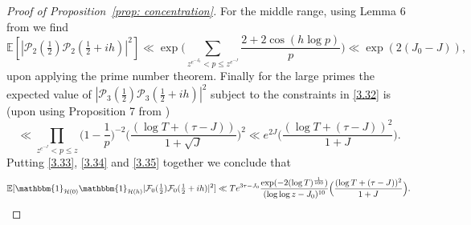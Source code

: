 \documentclass[12pt, notitlepage]{amsart}
\numberwithin{equation}{section}
\def\E{\mathbb E}
\theoremstyle{remark}
\theoremstyle{definition}
\theoremstyle{remark}
\numberwithin{equation}{section}
\begin{document}
\begin{proof}[Proof of Proposition~\ref{prop: concentration}]
For the middle range, using Lemma 6 from \cite{HarperLow} we find 
\begin{equation} 
\label{3.34} 
\E[|{\mathcal P}_2(\tfrac 12) {\mathcal P}_2(\tfrac 12+ih)|^2] \ll 
\exp\Big( \sum_{z^{e^{-J_0}} < p \le z^{e^{-J}}} \frac{2+2\cos(h\log p)}{p} \Big) \ll \exp( 2 (J_0-J)), 
\end{equation} 
upon applying the prime number theorem.  Finally for the large primes the expected value of $|{\mathcal P}_3(\tfrac 12){\mathcal P}_3(\tfrac 12 +ih)|^2$ subject to the constraints in \eqref{3.32} is (upon using Proposition 7 from \cite{HarperLow}) 
\begin{equation} 
\label{3.35} 
\ll \prod_{z^{e^{-J}}<p\le z} \Big(1-\frac 1p\Big)^{-2} \Big(\frac{(\log T + (\tau - J))}{1+\sqrt{J}}\Big)^2 
\ll e^{2J} \Big( \frac{(\log T + (\tau-J))^2}{1+J} \Big). 
\end{equation} 
Putting \eqref{3.33}, \eqref{3.34} and \eqref{3.35} together we conclude that 
\begin{equation} 
\label{3.36} 
\E[\mathbbm{1}_{\mathcal{H}(0)}\mathbbm{1}_{\mathcal{H}(h)}|{\mathcal F}_0(\tfrac 12){\mathcal F}_0(\tfrac 12+ih)|^2] 
\ll T e^{3\tau - J_0}  \frac{\exp(-2(\log T)^{\frac 1{100}})}{(\log \log z-J_0)^{10}} \Big( \frac{(\log T + (\tau-J))^2}{1+J} \Big).
\end{equation} 


\end{proof}
\end{document}
